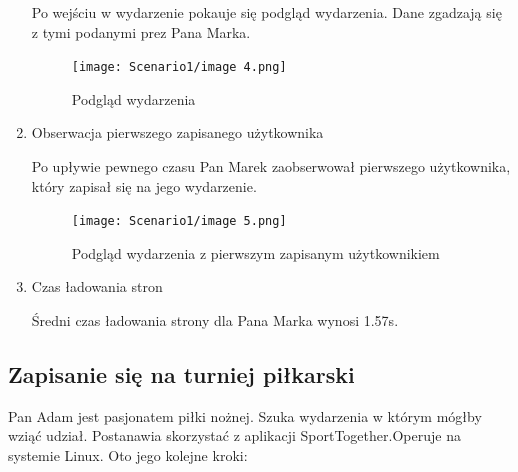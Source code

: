 \documentclass[11pt,a4paper]{article}
\begin{document}
\begin{enumerate}
    Po wejściu w wydarzenie pokauje się podgląd wydarzenia. Dane zgadzają się z tymi podanymi prez Pana Marka.

    \begin{figure} [H]
    \centering
    \texttt{[image: Scenario1/image 4.png]}
    \caption{Podgląd wydarzenia}
    \end{figure}
    
    \item Obserwacja pierwszego zapisanego użytkownika

    Po upływie pewnego czasu Pan Marek zaobserwował pierwszego użytkownika, który zapisał się na jego wydarzenie.

    \begin{figure} [H]
    \centering
    \texttt{[image: Scenario1/image 5.png]}
    \caption{Podgląd wydarzenia z pierwszym zapisanym użytkownikiem}
    \end{figure}

    \item Czas ładowania stron

    Średni czas ładowania strony dla Pana Marka wynosi 1.57s.
    
\end{enumerate}

\subsection{Zapisanie się na turniej piłkarski}

    Pan Adam jest pasjonatem piłki nożnej. Szuka wydarzenia w którym mógłby wziąć udział. Postanawia skorzystać z aplikacji SportTogether.Operuje na systemie Linux. Oto jego kolejne kroki:
\end{document}
